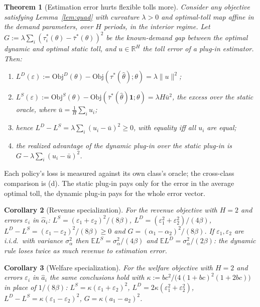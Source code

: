 \documentclass[11pt]{article}
\newtheorem{theorem}{Theorem}[section]
\newtheorem{corollary}[theorem]{Corollary}
\theoremstyle{definition}
\theoremstyle{remark}
\newcommand{\E}{\mathbb{E}}
\newcommand{\R}{\mathbb{R}}
\newcommand{\one}{\mathbf{1}}
\begin{document}
\begin{theorem}[Estimation error hurts flexible tolls more]\label{thm:est}
Consider any objective satisfying Lemma~\ref{lem:quad} with curvature $\lambda>0$ and optimal-toll map affine in the demand parameters, over $H$ periods, in the interior regime. Let $G:=\lambda\sum_i(\tau^*_i(\theta)-\bar\tau^*(\theta))^2$ be the known-demand gap between the optimal dynamic and optimal static toll, and $u\in\R^H$ the toll error of a plug-in estimator. Then:
\begin{enumerate}[label=(\alph*)]
\item $L^D(\varepsilon):=\mathrm{Obj}^D(\theta)-\mathrm{Obj}(\tau^*(\hat\theta);\theta)=\lambda\|u\|^2$;
\item $L^S(\varepsilon):=\mathrm{Obj}^S(\theta)-\mathrm{Obj}(\bar\tau^*(\hat\theta)\one;\theta)=\lambda H\bar u^2$, the excess over the static oracle, where $\bar u=\frac1H\sum_iu_i$;
\item hence $L^D-L^S=\lambda\sum_i(u_i-\bar u)^2\ge0$, with equality iff all $u_i$ are equal;
\item the realized advantage of the dynamic plug-in over the static plug-in is $G-\lambda\sum_i(u_i-\bar u)^2$.
\end{enumerate}
\end{theorem}
Each policy's loss is measured against its own class's oracle; the cross-class comparison is (d). The static plug-in pays only for the error in the average optimal toll, the dynamic plug-in pays for the whole error vector.

\begin{corollary}[Revenue specialization]\label{cor:rev}
For the revenue objective with $H=2$ and errors $\varepsilon_i$ in $\hat\alpha_i$: $L^S=(\varepsilon_1+\varepsilon_2)^2/(8\beta)$, $L^D=(\varepsilon_1^2+\varepsilon_2^2)/(4\beta)$, $L^D-L^S=(\varepsilon_1-\varepsilon_2)^2/(8\beta)\ge0$ and $G=(\alpha_1-\alpha_2)^2/(8\beta)$. If $\varepsilon_1,\varepsilon_2$ are i.i.d.\ with variance $\sigma_\alpha^2$ then $\E L^S=\sigma_\alpha^2/(4\beta)$ and $\E L^D=\sigma_\alpha^2/(2\beta)$: the dynamic rule loses twice as much revenue to estimation error.
\end{corollary}

\begin{corollary}[Welfare specialization]\label{cor:welf}
For the welfare objective with $H=2$ and errors $\varepsilon_i$ in $\hat a_i$ the same conclusions hold with $\kappa:=bc^2/\big(4(1+bc)^2(1+2bc)\big)$ in place of $1/(8\beta)$: $L^S=\kappa(\varepsilon_1+\varepsilon_2)^2$, $L^D=2\kappa(\varepsilon_1^2+\varepsilon_2^2)$, $L^D-L^S=\kappa(\varepsilon_1-\varepsilon_2)^2$, $G=\kappa(a_1-a_2)^2$.
\end{corollary}
\end{document}

